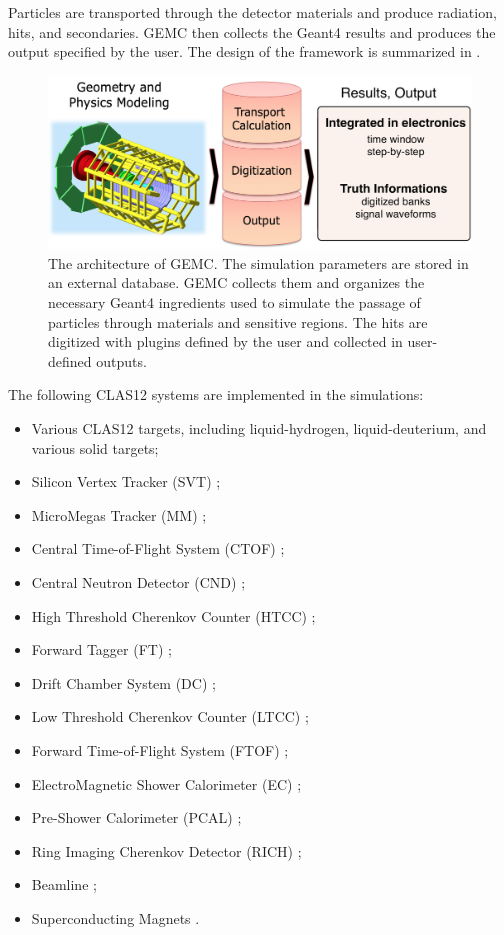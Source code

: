 Particles are transported through the detector materials and produce radiation, hits, and secondaries.
GEMC then collects the Geant4 results and produces the output specified by the user.
The design of the framework is summarized in .

\begin{figure}
	\centering
	\includegraphics[width=1.0\columnwidth,keepaspectratio]{img/gemcDesign.png}
	\caption{The architecture of GEMC. The simulation parameters are stored in an external database. GEMC collects
             them and organizes the necessary Geant4 ingredients used to simulate the
             passage of particles through materials and sensitive regions. The hits are digitized with
             plugins defined by the user and collected in user-defined outputs.  }
	\label{fig:gemcDesign}
\end{figure}

The following CLAS12 systems are implemented in the simulations:

\begin{itemize}
\item Various CLAS12 targets, including liquid-hydrogen, liquid-deuterium, and various solid targets;
\item Silicon Vertex Tracker (SVT) \cite{svt-nim};
\item MicroMegas Tracker (MM) \cite{mm-nim};
\item Central Time-of-Flight System (CTOF) \cite{ctof-nim};
\item Central Neutron Detector (CND) \cite{cnd-nim};
\item High Threshold Cherenkov Counter (HTCC) \cite{htcc-nim};
\item Forward Tagger (FT) \cite{ft-nim};
\item Drift Chamber System (DC) \cite{dc-nim};
\item Low Threshold Cherenkov Counter (LTCC) \cite{ltcc-nim};
\item Forward Time-of-Flight System (FTOF) \cite{ftof-nim};
\item ElectroMagnetic Shower Calorimeter (EC) \cite{Amarian:2001zs};
\item Pre-Shower Calorimeter (PCAL) \cite{ec-nim};
\item Ring Imaging Cherenkov Detector (RICH) \cite{rich-nim};
\item Beamline \cite{beamline-nim};
\item Superconducting Magnets \cite{magnets-nim}.
\end{itemize}

